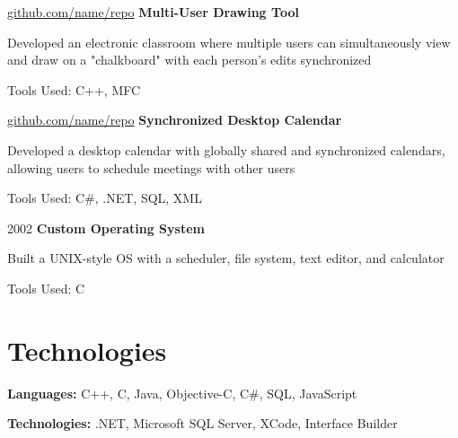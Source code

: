 	
	
	
	\begin{twocolentry}{
			\href{https://github.com/sinaatalay/rendercv}{github.com/name/repo}
		}
		\textbf{Multi-User Drawing Tool}\end{twocolentry}
	
	\vspace{0.10 cm}
	\begin{onecolentry}
		\begin{highlights}
			\item Developed an electronic classroom where multiple users can simultaneously view and draw on a "chalkboard" with each person's edits synchronized
			\item Tools Used: C++, MFC
		\end{highlights}
	\end{onecolentry}
	
	
	\vspace{0.2 cm}
	
	\begin{twocolentry}{
			\href{https://github.com/sinaatalay/rendercv}{github.com/name/repo}
		}
		\textbf{Synchronized Desktop Calendar}\end{twocolentry}
	
	\vspace{0.10 cm}
	\begin{onecolentry}
		\begin{highlights}
			\item Developed a desktop calendar with globally shared and synchronized calendars, allowing users to schedule meetings with other users
			\item Tools Used: C\#, .NET, SQL, XML
		\end{highlights}
	\end{onecolentry}
	
	
	\vspace{0.2 cm}
	
	\begin{twocolentry}{
			2002
		}
		\textbf{Custom Operating System}\end{twocolentry}
	
	\vspace{0.10 cm}
	\begin{onecolentry}
		\begin{highlights}
			\item Built a UNIX-style OS with a scheduler, file system, text editor, and calculator
			\item Tools Used: C
		\end{highlights}
	\end{onecolentry}
	
	
	
	
	\section{Technologies}
	
	
	
	
	\begin{onecolentry}
		\textbf{Languages:} C++, C, Java, Objective-C, C\#, SQL, JavaScript
	\end{onecolentry}
	
	\vspace{0.2 cm}
	
	\begin{onecolentry}
		\textbf{Technologies:} .NET, Microsoft SQL Server, XCode, Interface Builder
	\end{onecolentry}
	
	
	
	
